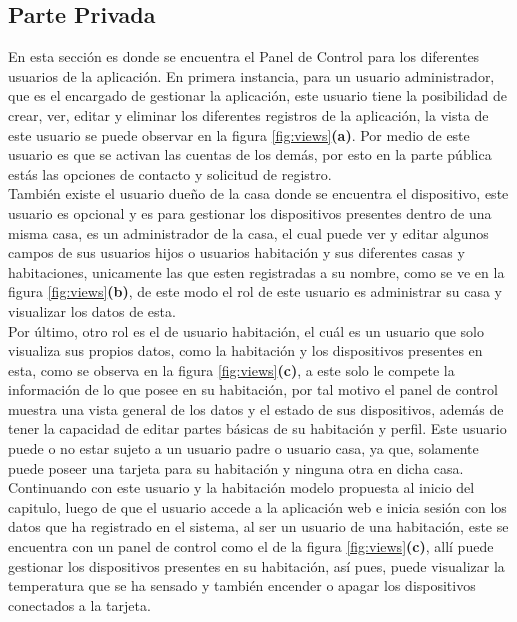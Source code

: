 \subsection{Parte Privada}

En esta sección es donde se encuentra el Panel de Control para los diferentes usuarios de la aplicación. En primera instancia, para un usuario administrador, que es el encargado de gestionar la aplicación, este usuario tiene la posibilidad de crear, ver, editar y eliminar los diferentes registros de la aplicación, la vista de este usuario se puede observar en la figura \ref{fig:views}\textbf{(a)}. Por medio de este usuario es que se activan las cuentas de los demás, por esto en la parte pública estás las opciones de contacto y solicitud de registro.\\

También existe el usuario dueño de la casa donde se encuentra el dispositivo, este usuario es opcional y es para gestionar los dispositivos presentes dentro de una misma casa, es un administrador de la casa, el cual puede ver y editar algunos campos de sus usuarios hijos o usuarios habitación y sus diferentes casas y habitaciones, unicamente las que esten registradas a su nombre, como se ve en la figura \ref{fig:views}\textbf{(b)}, de este modo el rol de este usuario es administrar su casa y visualizar los datos de esta.\\

Por último, otro rol es el de usuario habitación, el cuál es un usuario que solo visualiza sus propios datos, como la habitación y los dispositivos presentes en esta, como se observa en la figura \ref{fig:views}\textbf{(c)}, a este solo le compete la información de lo que posee en su habitación, por tal motivo el panel de control muestra una vista general de los datos y el estado de sus dispositivos, además de tener la capacidad de editar partes básicas de su habitación y perfil. Este usuario puede o no estar sujeto a un usuario padre o usuario casa, ya que, solamente puede poseer una tarjeta para su habitación y ninguna otra en dicha casa.\\

Continuando con este usuario y la habitación modelo propuesta al inicio del capitulo, luego de que el usuario accede a la aplicación web e inicia sesión con los datos que ha registrado en el sistema, al ser un usuario de una habitación, este se encuentra con un panel de control como el de la figura \ref{fig:views}\textbf{(c)}, allí puede gestionar los dispositivos presentes en su habitación, así pues, puede visualizar la temperatura que se ha sensado y también encender o apagar los dispositivos conectados a la tarjeta.\\

